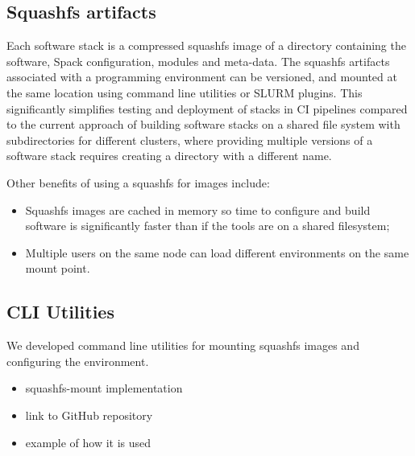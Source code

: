 \subsection{Squashfs artifacts}


Each software stack is a compressed squashfs image of a directory containing the software, Spack configuration, modules and meta-data.
The squashfs artifacts associated with a programming environment can be versioned, and mounted at the same location using command line utilities or SLURM plugins.
This significantly simplifies testing and deployment of stacks in CI pipelines compared to the current approach of building software stacks on a shared file system with subdirectories for different clusters, where providing multiple versions of a software stack requires creating a directory with a different name.

Other benefits of using a squashfs for images include:
\begin{itemize}
    \item Squashfs images are cached in memory so time to configure and build software is significantly faster than if the tools are on a shared filesystem;
    \item Multiple users on the same node can load different environments on the same mount point.
\end{itemize}

\subsection{CLI Utilities}


We developed command line utilities for mounting squashfs images and configuring the environment.

\begin{itemize}
    \item squashfs-mount implementation
    \item link to GitHub repository
    \item example of how it is used
\end{itemize}

